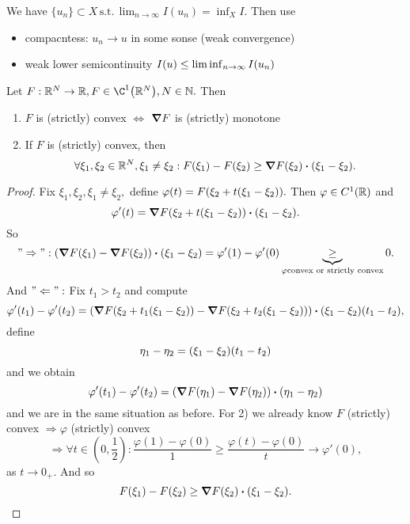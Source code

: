 \documentclass{article}
\begin{document}
\begin{remark}
	We have $\{u_n\}\subset X \, \text{s.t.} \, \lim_{n\to \infty} I(u_n) = \inf_X I.$ Then use
	\begin{itemize}
		\item compacntess: $u_n \to u$ in some sonse (weak convergence)
		\item weak lower semicontinuity $I(u) \leq \liminf_{n\to \infty}I\qty(u_n)$
	\end{itemize}
\end{remark}

\begin{lemma}
    Let $F: \R^N \to \R, F \in \C^1\qty(\R^N), N \in \N.$ Then 
    \begin{enumerate}
	    \item $F$ is (strictly) convex $\Leftrightarrow$ $\grad F$ is (strictly) monotone
	\item If $F$ is (strictly) convex, then
		\[
			\forall \xi_1, \xi_2 \in \R^N, \xi_1 \neq \xi_2: F\qty(\xi_1)-F\qty(\xi_2)\geq \grad F\qty(\xi_2)\vdot \qty(\xi_1 - \xi_2).
		\]
    \end{enumerate}
\end{lemma}
\begin{proof}
    Fix $\xi_1, \xi_2, \xi_1 \neq \xi_2,$ define $\varphi(t) = F\qty(\xi_2 + t\qty(\xi_1 - \xi_2)).$ Then $\varphi \in C^1\qty({\mathbb R})$ and
    \[
	    \varphi'(t) = \grad F\qty(\xi_2 +t\qty(\xi_1 - \xi_2))\vdot \qty(\xi_1 - \xi_2).
    \]
    So
    \[
	    "\Rightarrow": \qty(\grad F\qty(\xi_1) - \grad F\qty(\xi_2))\vdot\qty(\xi_1-\xi_2) = \varphi'(1)-\varphi'(0) \underbrace{\geq}_{\varphi \text{convex or strictly convex}} 0.
    \]
    And $"\Leftarrow":$ Fix $t_1 > t_2$ and compute
    \[
	    \varphi'\qty(t_1) - \varphi'\qty(t_2) = \qty(\grad F\qty(\xi_2 + t_1\qty(\xi_1 - \xi_2))- \grad F\qty(\xi_2 + t_2\qty(\xi_1-\xi_2)))\vdot\qty(\xi_1-\xi_2)\qty(t_1-t_2),
    \]
    define
    \[
	    \eta_1 - \eta_2 = \qty(\xi_1 - \xi_2)\qty(t_1-t_2)
    \]
    and we obtain
    \[
	    \varphi'(t_1) - \varphi'(t_2) = \qty(\grad F\qty(\eta_1)-\grad F\qty(\eta_2))\vdot \qty(\eta_1 - \eta_2)
    \]
    and we are in the same situation as before. For 2) we already know $F$ (strictly) convex $\Rightarrow \varphi$ (strictly) convex
    \[
	    \Rightarrow \forall t \in (0,\frac{1}{2}): \frac{\varphi(1)-\varphi(0)}{1} \geq \frac{\varphi(t)-\varphi(0)}{t}\to \varphi'(0),
    \]
    as $t\to 0_+.$ And so
    \[
	    F\qty(\xi_1) - F\qty(\xi_2) \geq \grad F\qty(\xi_2)\vdot \qty(\xi_1 - \xi_2).
    \]
\end{proof}
\end{document}
